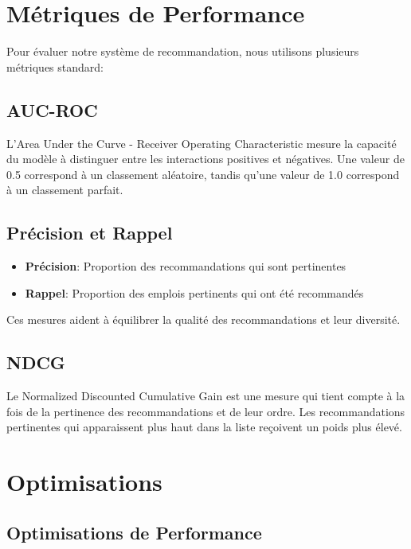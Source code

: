 \documentclass[12pt,a4paper]{article}
\begin{document}
\section{Métriques de Performance}
Pour évaluer notre système de recommandation, nous utilisons plusieurs métriques standard:

\subsection{AUC-ROC}
\begin{definitionbox}[title=AUC-ROC]
L'Area Under the Curve - Receiver Operating Characteristic mesure la capacité du modèle à distinguer entre les interactions positives et négatives. Une valeur de 0.5 correspond à un classement aléatoire, tandis qu'une valeur de 1.0 correspond à un classement parfait.
\end{definitionbox}

\subsection{Précision et Rappel}
\begin{itemize}
    \item \textbf{Précision}: Proportion des recommandations qui sont pertinentes
    \item \textbf{Rappel}: Proportion des emplois pertinents qui ont été recommandés
\end{itemize}

Ces mesures aident à équilibrer la qualité des recommandations et leur diversité.

\subsection{NDCG}
\begin{definitionbox}[title=NDCG]
Le Normalized Discounted Cumulative Gain est une mesure qui tient compte à la fois de la pertinence des recommandations et de leur ordre. Les recommandations pertinentes qui apparaissent plus haut dans la liste reçoivent un poids plus élevé.
\end{definitionbox}

\section{Optimisations}
\subsection{Optimisations de Performance}
\end{document}
